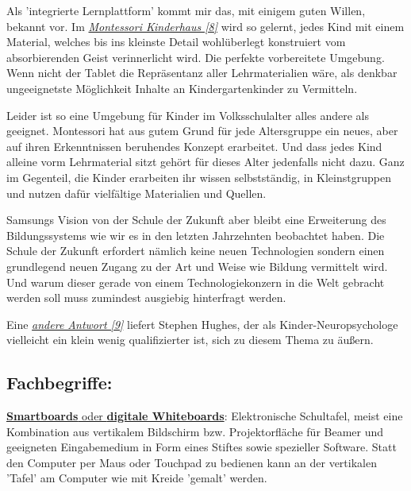 \documentclass[10pt,a4paper,ngerman,twoside]{article} %
\begin{document}
Als 'integrierte Lernplattform' kommt mir das, mit einigem guten Willen, bekannt vor. Im \href{http://www.montessori-kindergarten.at/}{\textit{Montessori Kinderhaus [8]}} wird so gelernt, jedes Kind mit einem Material, welches bis ins kleinste Detail wohlüberlegt konstruiert vom absorbierenden Geist verinnerlicht wird. Die perfekte vorbereitete Umgebung. Wenn nicht der Tablet die Repräsentanz aller Lehrmaterialien wäre, als denkbar ungeeignetste Möglichkeit Inhalte an Kindergartenkinder zu Vermitteln.

Leider ist so eine Umgebung für Kinder im Volksschulalter alles andere als geeignet. Montessori hat aus gutem Grund für jede Altersgruppe ein neues, aber auf ihren Erkenntnissen beruhendes Konzept erarbeitet. Und dass jedes Kind alleine vorm Lehrmaterial sitzt gehört für dieses Alter jedenfalls nicht dazu. Ganz im Gegenteil, die Kinder erarbeiten ihr wissen selbstständig, in Kleinstgruppen und nutzen dafür vielfältige Materialien und Quellen.

Samsungs Vision von der Schule der Zukunft aber bleibt eine Erweiterung des Bildungssystems wie wir es in den letzten Jahrzehnten beobachtet haben. Die Schule der Zukunft erfordert nämlich keine neuen Technologien sondern einen grundlegend neuen Zugang zu der Art und Weise wie Bildung vermittelt wird. Und warum dieser gerade von einem Technologiekonzern in die Welt gebracht werden soll muss zumindest ausgiebig hinterfragt werden.

Eine \href{https://vimeo.com/40791188}{\textit{andere Antwort [9]}} 
liefert Stephen Hughes, der als Kinder-Neuropsychologe vielleicht ein klein wenig qualifizierter ist, sich zu diesem Thema zu äußern.
\subsection*{Fachbegriffe:}
\href{https://de.wikipedia.org/wiki/Smartboard#Digitale_Whiteboards}{\textbf{Smartboards} oder \textbf{digitale Whiteboards}}: Elektronische Schultafel, meist eine Kombination aus vertikalem Bildschirm bzw. Projektorfläche für Beamer und geeigneten Eingabemedium in Form eines Stiftes sowie spezieller Software. Statt den Computer per Maus oder Touchpad zu bedienen kann an der vertikalen 'Tafel' am Computer wie mit Kreide 'gemalt' werden.
\end{document}
